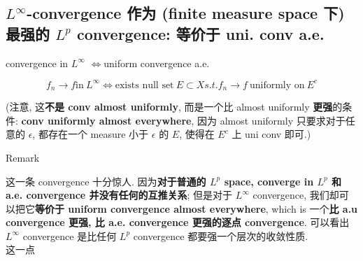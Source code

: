 \documentclass{qlnotes-export}
\begin{document}
\subsection{\texorpdfstring{\(L^{\infty}\)-convergence 作为 (finite measure space 下) 最强的 \(L^{p}\) convergence: 等价于 uni. conv a.e.}{L\^{}\{\textbackslash infty\}-convergence 作为 (finite measure space 下) 最强的 L\^{}\{p\} convergence: 等价于 uni. conv a.e.}}\label{linfty-convergence-ux4f5cux4e3a-finite-measure-space-ux4e0b-ux6700ux5f3aux7684-lp-convergence-ux7b49ux4ef7ux4e8e-uni.-conv-a.e.}

\begin{theorem}{convergence in \(L^{\infty}\) \(\Leftrightarrow\)uniform convergence
a.e.}\label{thm-09-l-p-space-and-inequalities-convergence-in-l-infty-iffuniform-convergence-a-e}

\[f_{n}\rightarrow f\text{in}\ L^{\infty}\Leftrightarrow\text{exists null set}\ E \subset X s.t.f_{n}\rightarrow f\ \text{uniformly on}\ E^{c}\]

(注意, 这\textbf{不是 conv almost uniformly}, 而是一个比 almost uniformly \textbf{更强}的条件: \textbf{conv uniformly almost everywhere}, 因为 almost uniformly 只要求对于任意的 \(\epsilon\), 都存在一个 measure 小于 \(\epsilon\) 的 \(E\), 使得在 \(E^{c}\) 上 uni conv 即可.)

\end{theorem}

\begin{qlremark}{Remark}

这一条 convergence 十分惊人. 因为\textbf{对于普通的 \(L^{p}\) space, converge in \(L^{p}\) 和 a.e. convergence 并没有任何的互推关系}; 但是对于 \(L^{\infty}\) convergence, 我们却可以把它\textbf{等价于 uniform convergence almost everywhere}, which is 一个\textbf{比 a.u convergence 更强, 比 a.e. convergence 更强的逐点 convergence}. 可以看出 \(L^{\infty}\) convergence 是比任何 \(L^{p}\) convergence 都要强一个层次的收敛性质.\\
这一点

\end{qlremark}
\end{document}

